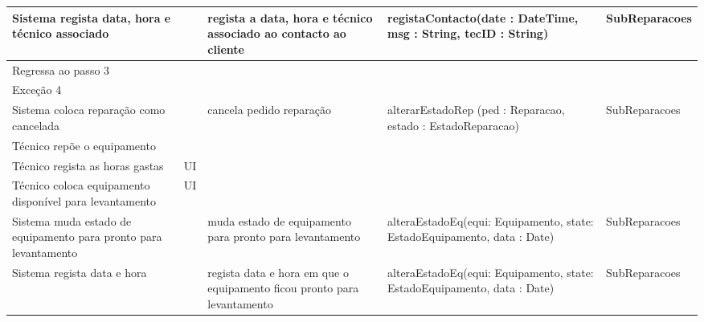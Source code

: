 \documentclass[../relatorio.tex]{subfiles}
\begin{document}
\begin{landscape}
\begin{table}[!h]
\begin{tabular}{|p{5cm}|p{1cm}|p{4cm}|p{6cm}|p{3cm}|}
            \\
            \hline
            Sistema regista data, hora e técnico associado
                     & 
                     & regista a data, hora e técnico associado ao contacto ao cliente 
                     & registaContacto(date : DateTime, msg : String, tecID : String)
                     & SubReparacoes
            \\
            \hline
            Regressa ao passo 3
                     & 
                     & 
                     & 
                     & 
            \\
            \hline
            \rowcolor{red!30}
            Exceção 4 &                                                  &                  &     &            \\
            \hline
            Sistema coloca reparação como cancelada
                     & 
                     & cancela pedido reparação
                     & alterarEstadoRep (ped : Reparacao, estado : EstadoReparacao)
                     & SubReparacoes
            \\
            \hline
            Técnico repõe o equipamento
                     & 
                     & 
                     & 
                     & 
            \\
            \hline
            \rowcolor{yellow}
            Técnico regista as horas gastas
                     & UI
                     & 
                     & 
                     & 
            \\
            \hline
            \rowcolor{yellow}
            Técnico coloca equipamento disponível para levantamento
                     & UI
                     & 
                     & 
                     & 
            \\
            \hline
            Sistema muda estado de equipamento para pronto para levantamento
                     & 
                     & muda estado de equipamento para pronto para levantamento
                     & alteraEstadoEq(equi: Equipamento, state: EstadoEquipamento, data : Date)
                     & SubReparacoes
            \\
            \hline
            Sistema regista data e hora
                     & 
                     & regista data e hora em que o equipamento ficou pronto para levantamento
                     & alteraEstadoEq(equi: Equipamento, state: EstadoEquipamento, data : Date)
                     & SubReparacoes
            \\
            \hline
        \end{tabular}
    \end{table}
\end{landscape}
\end{document}
